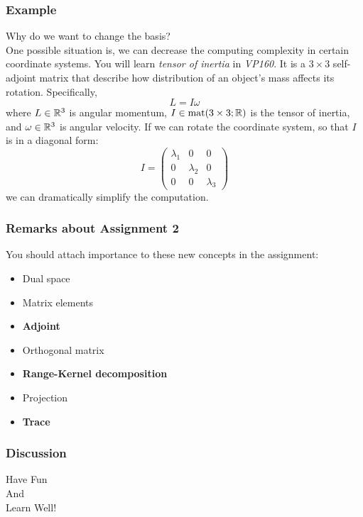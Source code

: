 \documentclass[12pt, t]{beamer}
\renewcommand{\emph}[1]{{\color{Turquoise3}\textsl{#1}}}
\begin{document}
\begin{frame}
    \frametitle{Example}
    Why do we want to change the basis?\\[9pt]
    \pause
    One possible situation is, we can decrease the computing complexity in certain coordinate systems. You will learn \emph{tensor of inertia} in \textit{VP160}. It is a $3\times 3$ self-adjoint matrix that describe how distribution of an object's mass affects its rotation. Specifically,
    $$L=I\omega$$
    where $L\in \mathbb{R}^3$ is angular momentum, $I\in \text{mat}(3\times 3;\mathbb{R})$ is the tensor of inertia, and $\omega\in\mathbb{R}^3$ is angular velocity.
    If we can rotate the coordinate system, so that $I$ is in a diagonal form:
    $$
        I=\begin{pmatrix}
            \lambda_1 & 0         & 0         \\
            0         & \lambda_2 & 0         \\
            0         & 0         & \lambda_3
        \end{pmatrix}
    $$
    we can dramatically simplify the computation.
\end{frame}

\begin{frame}
    \frametitle{Remarks about Assignment 2}
    You should attach importance to these new concepts in the assignment:
    \begin{itemize}
        \item Dual space
        \item Matrix elements
        \item \textbf{Adjoint}
        \item Orthogonal matrix
        \item \textbf{Range-Kernel decomposition}
        \item Projection
        \item \textbf{Trace}
    \end{itemize}
\end{frame}

\begin{frame}
    \frametitle{Discussion}
    \vspace{1cm}
    \begin{center}
        \LARGE
        Have Fun\\
        And\\
        Learn Well!
    \end{center}


\end{frame}
\end{document}
